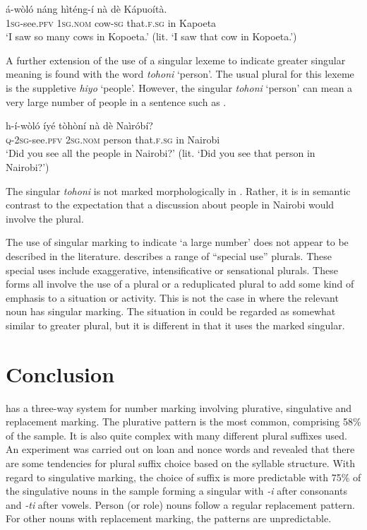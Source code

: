 \documentclass[output=paper]{langsci/langscibook}
\begin{document}
\ea\label{ex:moodie:13}
\gll á-wòló náng hìténg-í nà dè Kápuoítà. \\
1\textsc{sg}-see.\textsc{pfv} 1\textsc{sg.nom} cow-\textsc{sg} that.\textsc{f.sg} in Kapoeta \\
\glt ‘I saw so many cows in Kopoeta.’ (lit. ‘I saw that cow in Kopoeta.’)
\z

A further extension of the use of a singular lexeme to indicate greater singular meaning is found with the word \textit{tohoni} ‘person’. The usual plural for this lexeme is the suppletive \textit{hiyo} ‘people’. However, the singular \textit{tohoni} ‘person’ can mean a very large number of people in a sentence such as .

\ea\label{ex:moodie:14}
\gll h-í-wòló íyé tòhòní nà dè Naìróbí? \\
\textsc{q-2sg}-see.\textsc{pfv} 2\textsc{sg.nom} person that.\textsc{f.sg} in Nairobi \\
\glt ‘Did you see all the people in Nairobi?’ (lit. ‘Did you see that person in Nairobi?’)
\z

The singular \textit{tohoni} is not marked morphologically in . Rather, it is in semantic contrast to the expectation that a discussion about people in Nairobi would involve the plural.

The use of singular marking to indicate ‘a large number’ does not appear to be described in the literature. \citet[234]{Corbett2000} describes a range of “special use” plurals. These special uses include exaggerative, intensificative or sensational plurals. These forms all involve the use of a plural or a reduplicated plural to add some kind of emphasis to a situation or activity. This is not the case in  where the relevant noun has singular marking. The situation in  could be regarded as somewhat similar to greater plural, but it is different in that it uses the marked singular. 

\section{Conclusion}

 has a three-way system for number marking involving plurative, singulative and replacement marking. The plurative pattern is the most common, comprising 58\% of the sample. It is also quite complex with many different plural suffixes used. An experiment was carried out on loan and nonce words and revealed that there are some tendencies for plural suffix choice based on the syllable structure. With regard to singulative marking, the choice of suffix is more predictable with 75\% of the singulative nouns in the sample forming a singular with \textit{-i} after consonants and \textit{-ti} after vowels. Person (or role) nouns follow a regular replacement pattern. For other nouns with replacement marking, the patterns are unpredictable.
\end{document}
